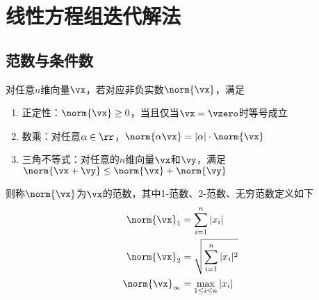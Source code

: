 
\section{线性方程组迭代解法}
\subsection{范数与条件数}
\begin{definition}[向量的范数]
    对任意$n$维向量$\vx$，若对应非负实数$\norm{\vx}$，满足
    \begin{enumerate}
        \item 正定性：$\norm{\vx}\geq 0$，当且仅当$\vx=\vzero$时等号成立
        \item 数乘：对任意$\alpha\in\rr$，$\norm{\alpha\vx}=|\alpha|\cdot\norm{\vx}$
        \item 三角不等式：对任意的$n$维向量$\vx$和$\vy$，满足$\norm{\vx+\vy}\leq\norm{\vx}+\norm{\vy}$
    \end{enumerate}
    则称$\norm{\vx}$为$\vx$的范数，其中1-范数、2-范数、无穷范数定义如下
    \[\begin{aligned}
        \norm{\vx}_1&=\sum_{i=1}^n|x_i|\\
        \norm{\vx}_2&=\sqrt{\sum_{i=1}^n|x_i|^2}\\
        \norm{\vx}_\infty&=\max_{1\leq i\leq n}|x_i|
    \end{aligned}\]
\end{definition}

